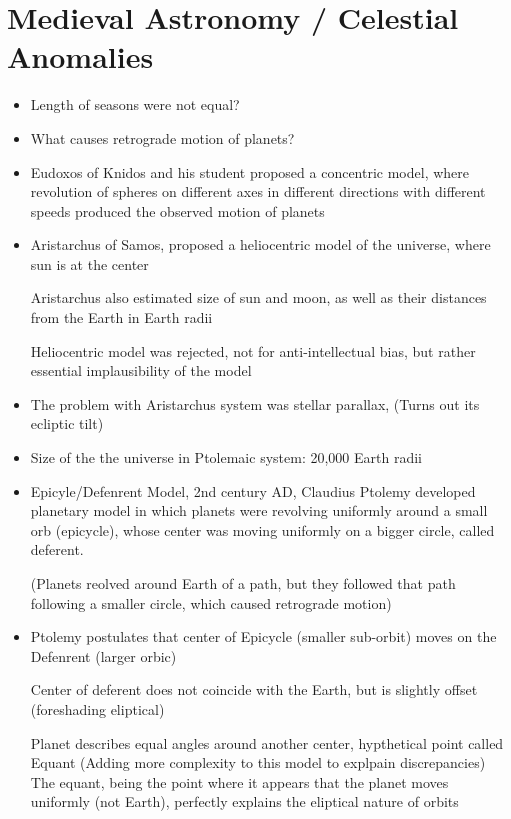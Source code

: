 \documentclass{article}
\begin{document}
\section*{Medieval Astronomy / Celestial Anomalies}
\begin{itemize}
  \item Length of seasons were not equal?
  \item What causes retrograde motion of planets?
  \item Eudoxos of Knidos and his student proposed a concentric model,
    where revolution of spheres on different axes in different directions
    with different speeds produced the observed motion of planets
  \item Aristarchus of Samos,
    proposed a heliocentric model of the universe, where sun is at the center

    Aristarchus also estimated size of sun and moon, as well as their
    distances from the Earth in Earth radii

    Heliocentric model was rejected, not for anti-intellectual bias, but rather
    essential implausibility of the model
  \item The problem with Aristarchus system was stellar parallax,
    (Turns out its ecliptic tilt)
  \item Size of the the universe in Ptolemaic system: 20,000 Earth radii
  \item Epicyle/Defenrent Model,
    2nd century AD, Claudius Ptolemy developed planetary model in which planets
    were revolving uniformly around a small orb (epicycle), whose center
    was moving uniformly on a bigger circle, called deferent.

    (Planets reolved around Earth of a path, but they followed that path
    following a smaller circle, which caused retrograde motion)
  \item Ptolemy postulates that center of Epicycle (smaller sub-orbit) moves
    on the Defenrent (larger orbic)

    Center of deferent does not coincide with the Earth, but is slightly offset (foreshading eliptical)

    Planet describes equal angles around another center, hypthetical point called Equant
    (Adding more complexity to this model to explpain discrepancies)
    The equant, being the point where it appears that the planet moves uniformly (not Earth),
    perfectly explains the eliptical nature of orbits
\end{itemize}
\end{document}

